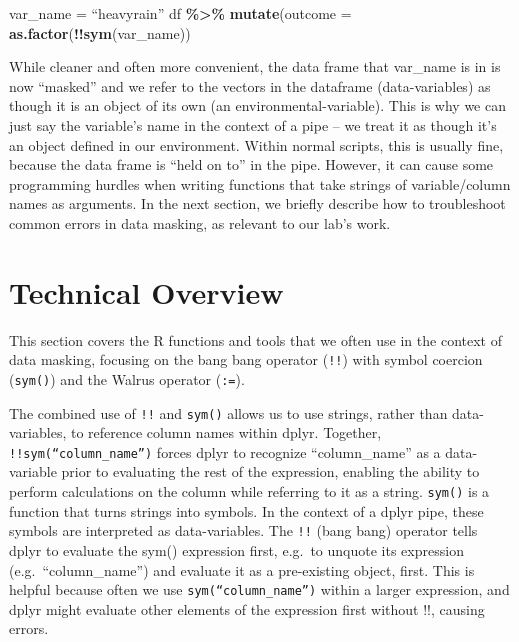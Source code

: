 \documentclass[
]{book}
\newenvironment{Shaded}{\begin{snugshade}}{\end{snugshade}}
\newcommand{\AttributeTok}[1]{\textcolor[rgb]{0.13,0.29,0.53}{#1}}
\newcommand{\FunctionTok}[1]{\textcolor[rgb]{0.13,0.29,0.53}{\textbf{#1}}}
\newcommand{\NormalTok}[1]{#1}
\newcommand{\OtherTok}[1]{\textcolor[rgb]{0.56,0.35,0.01}{#1}}
\newcommand{\SpecialCharTok}[1]{\textcolor[rgb]{0.81,0.36,0.00}{\textbf{#1}}}
\begin{document}
\begin{Shaded}
\begin{Highlighting}[]
\NormalTok{var\_name }\OtherTok{=}\NormalTok{ “heavyrain”}
\NormalTok{df }\SpecialCharTok{\%\textgreater{}\%} \FunctionTok{mutate}\NormalTok{(}\AttributeTok{outcome =} \FunctionTok{as.factor}\NormalTok{(}\SpecialCharTok{!!}\FunctionTok{sym}\NormalTok{(var\_name)) }
\end{Highlighting}
\end{Shaded}

While cleaner and often more convenient, the data frame that var\_name is in is now ``masked'' and we refer to the vectors in the dataframe (data-variables) as though it is an object of its own (an environmental-variable). This is why we can just say the variable's name in the context of a pipe -- we treat it as though it's an object defined in our environment. Within normal scripts, this is usually fine, because the data frame is ``held on to'' in the pipe. However, it can cause some programming hurdles when writing functions that take strings of variable/column names as arguments. In the next section, we briefly describe how to troubleshoot common errors in data masking, as relevant to our lab's work.

\section{Technical Overview}\label{technical-overview}

This section covers the R functions and tools that we often use in the context of data masking, focusing on the bang bang operator (\texttt{!!}) with symbol coercion (\texttt{sym()}) and the Walrus operator (\texttt{:=}).

The combined use of \texttt{!!} and \texttt{sym()} allows us to use strings, rather than data-variables, to reference column names within dplyr. Together, \texttt{!!sym(“column\_name”)} forces dplyr to recognize ``column\_name'' as a data-variable prior to evaluating the rest of the expression, enabling the ability to perform calculations on the column while referring to it as a string.
\texttt{sym()} is a function that turns strings into symbols. In the context of a dplyr pipe, these symbols are interpreted as data-variables.
The \texttt{!!} (bang bang) operator tells dplyr to evaluate the sym() expression first, e.g.~to unquote its expression (e.g.~``column\_name'') and evaluate it as a pre-existing object, first. This is helpful because often we use \texttt{sym(“column\_name”)} within a larger expression, and dplyr might evaluate other elements of the expression first without !!, causing errors.
\end{document}
